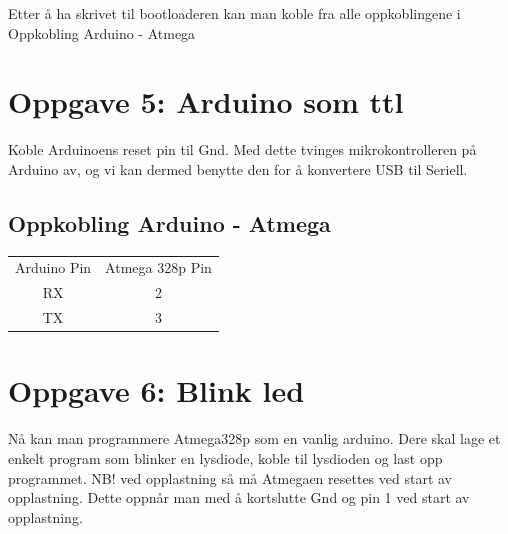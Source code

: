 \documentclass{article}
\begin{document}
Etter å ha skrivet til bootloaderen kan man koble fra alle oppkoblingene i Oppkobling Arduino - Atmega

\section*{Oppgave 5: Arduino som ttl}
Koble Arduinoens reset pin til Gnd. Med dette tvinges mikrokontrolleren på Arduino av, og vi kan dermed benytte den for å konvertere USB til Seriell.

\subsection*{Oppkobling Arduino - Atmega}
\begin{center}
    \begin{longtable}{||c|c||}
    \cline{1-2}
    Arduino Pin & Atmega 328p Pin\\
    \cline{1-2}
    \cline{1-2}
    RX & 2 \\
    \cline{1-2}
    TX & 3 \\
    \cline{1-2}
    \end{longtable}
\end{center}

\section*{Oppgave 6: Blink led}
Nå kan man programmere Atmega328p som en vanlig arduino. Dere skal lage et enkelt program som blinker en lysdiode, koble til lysdioden og last opp programmet. NB! ved opplastning så må Atmegaen resettes ved start av opplastning. Dette oppnår man med å kortslutte Gnd og pin 1 ved start av opplastning.
\end{document}
